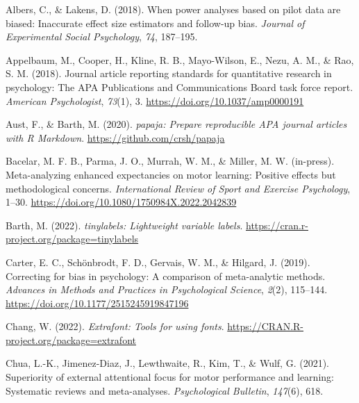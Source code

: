 \documentclass[
  doc, donotrepeattitle,floatsintext]{apa7}
\newlength{\cslhangindent}
\newlength{\cslentryspacingunit} %
\newenvironment{CSLReferences}[2] %
 {%
  \setlength{\parindent}{0pt}
  \ifodd #1
  \let\oldpar\par
  \def\par{\hangindent=\cslhangindent\oldpar}
  \fi
  \setlength{\parskip}{#2\cslentryspacingunit}
 }%
 {}
\begin{document}
\hypertarget{refs}{}
\begin{CSLReferences}{1}{0}
\leavevmode{}%
Albers, C., \& Lakens, D. (2018). When power analyses based on pilot data are biased: Inaccurate effect size estimators and follow-up bias. \emph{Journal of Experimental Social Psychology}, \emph{74}, 187--195.

\leavevmode{}%
Appelbaum, M., Cooper, H., Kline, R. B., Mayo-Wilson, E., Nezu, A. M., \& Rao, S. M. (2018). Journal article reporting standards for quantitative research in psychology: {The} {APA} {Publications} and {Communications} {Board} task force report. \emph{American Psychologist}, \emph{73}(1), 3. \url{https://doi.org/10.1037/amp0000191}

\leavevmode{}%
Aust, F., \& Barth, M. (2020). \emph{{papaja}: {Prepare} reproducible {APA} journal articles with {R Markdown}}. \url{https://github.com/crsh/papaja}

\leavevmode{}%
Bacelar, M. F. B., Parma, J. O., Murrah, W. M., \& Miller, M. W. (in-press). Meta-analyzing enhanced expectancies on motor learning: Positive effects but methodological concerns. \emph{International Review of Sport and Exercise Psychology}, 1--30. \url{https://doi.org/10.1080/1750984X.2022.2042839}

\leavevmode{}%
Barth, M. (2022). \emph{{tinylabels}: Lightweight variable labels}. \url{https://cran.r-project.org/package=tinylabels}

\leavevmode{}%
Carter, E. C., Schönbrodt, F. D., Gervais, W. M., \& Hilgard, J. (2019). Correcting for bias in psychology: A comparison of meta-analytic methods. \emph{Advances in Methods and Practices in Psychological Science}, \emph{2}(2), 115--144. \url{https://doi.org/10.1177/2515245919847196}

\leavevmode{}%
Chang, W. (2022). \emph{Extrafont: Tools for using fonts}. \url{https://CRAN.R-project.org/package=extrafont}

\leavevmode{}%
Chua, L.-K., Jimenez-Diaz, J., Lewthwaite, R., Kim, T., \& Wulf, G. (2021). Superiority of external attentional focus for motor performance and learning: Systematic reviews and meta-analyses. \emph{Psychological Bulletin}, \emph{147}(6), 618.


\end{CSLReferences}
\end{document}
